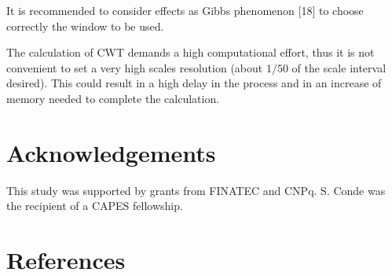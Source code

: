 \documentclass[12pt, a4paper]{article}
\begin{document}
It is recommended to consider effects as Gibbs phenomenon [18] to choose correctly the window to be used.

The calculation of CWT demands a high computational effort, thus it is not convenient to set a very high scales resolution (about $1/50$ of the scale interval desired). This could result in a high delay in the process and in an increase of memory needed to complete the calculation.

\section{Acknowledgements}

This study was supported by grants from FINATEC and CNPq. S. Conde was the recipient of a CAPES fellowship.

\section{References}
\end{document}
